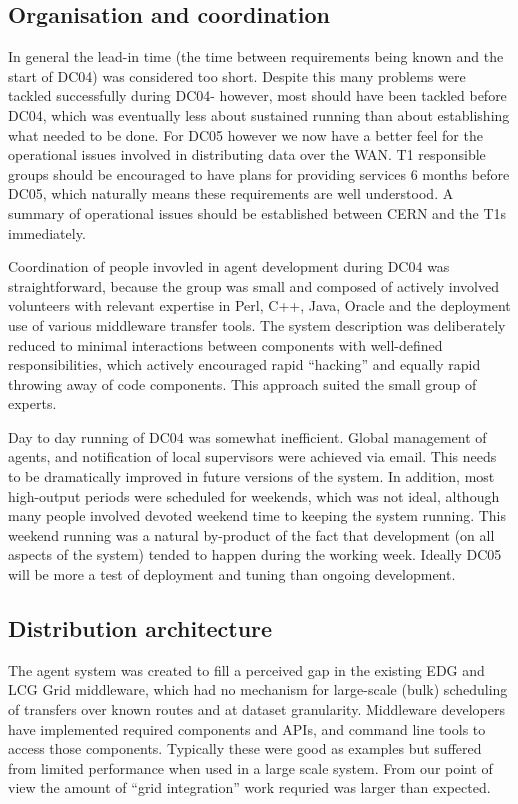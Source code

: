 \documentclass{cmspaper}
\begin{document}
\subsection{Organisation and coordination}
In general the lead-in time (the time between requirements being known
and the start of DC04) was considered too short. Despite this many
problems were tackled successfully during DC04- however, most should
have been tackled before DC04, which was eventually less about
sustained running than about establishing what needed to be done. For
DC05 however we now have a better feel for the operational issues
involved in distributing data over the WAN. T1 responsible groups
should be encouraged to have plans for providing services 6 months
before DC05, which naturally means these requirements are well
understood. A summary of operational issues should be established
between CERN and the T1s immediately.

Coordination of people invovled in agent development during DC04 was
straightforward, because the group was small and composed of actively
involved volunteers with relevant expertise in Perl, C++, Java, Oracle
and the deployment use of various middleware transfer tools. The
system description was deliberately reduced to minimal interactions
between components with well-defined responsibilities, which actively
encouraged rapid ``hacking'' and equally rapid throwing away of code
components. This approach suited the small group of experts.

Day to day running of DC04 was somewhat inefficient. Global management
of agents, and notification of local supervisors were achieved via
email. This needs to be dramatically improved in future versions of
the system. In addition, most high-output periods were scheduled for
weekends, which was not ideal, although many people involved devoted
weekend time to keeping the system running. This weekend running was
a natural by-product of the fact that development (on all aspects of
the system) tended to happen during the working week. Ideally DC05
will be more a test of deployment and tuning than ongoing development.

\subsection{Distribution architecture}
The agent system was created to fill a perceived gap in the existing
EDG and LCG Grid middleware, which had no mechanism for large-scale
(bulk) scheduling of transfers over known routes and at dataset
granularity. Middleware developers have implemented required
components and APIs, and command line tools to access those
components. Typically these were good as examples but suffered from
limited performance when used in a large scale system. From our point
of view the amount of ``grid integration'' work requried was larger
than expected.
\end{document}
